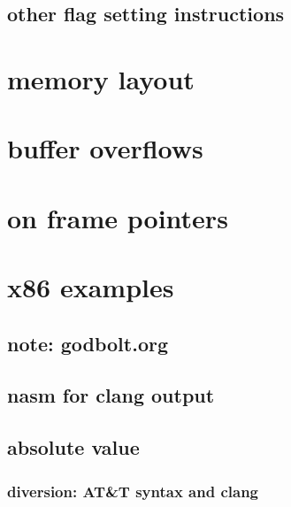 

\subsection{other flag setting instructions}



\section{memory layout}



\section{buffer overflows}



\section{on frame pointers}




\section{x86 examples}

\subsection{note: godbolt.org}



\subsection{nasm for clang output}



\subsection{absolute value}





\subsubsection{diversion: AT\&T syntax and clang}

